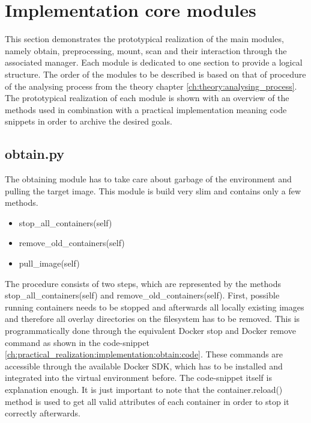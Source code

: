 \section{Implementation core modules}
\label{ch:practical_realization:implementation}
This section demonstrates the prototypical realization of the main modules, namely obtain, preprocessing, mount, scan and their interaction through the associated manager. Each module is dedicated to one section to provide a logical structure. The order of the modules to be described is based on that of procedure of the analysing process from the theory chapter \ref{ch:theory:analysing_process}.
The prototypical realization of each module is shown with an overview of the methods used in combination with a practical implementation meaning code snippets in order to archive the desired goals. 

\subsection{obtain.py}
\label{ch:practical_realization:implementation:obtain}
The obtaining module has to take care about garbage of the environment and pulling the target image.
This module is build very slim and contains only a few methods.
\begin{itemize}
\item stop\_all\_containers(self)
\item remove\_old\_containers(self)
\item pull\_image(self)
\end{itemize}
The procedure consists of two steps, which are represented by the methods stop\_all\_containers(self) and remove\_old\_containers(self). First, possible running containers needs to be stopped and afterwards all locally existing images and therefore all overlay directories on the filesystem has to be removed. This is programmatically done through the equivalent Docker stop and Docker remove command as shown in the code-snippet \ref{ch:practical_realization:implementation:obtain:code}. These commands are accessible through the available Docker SDK, which has to be installed and integrated into the virtual environment before. 
The code-snippet itself is explanation enough. It is just important to note that the container.reload() method is used to get all valid attributes of each container in order to stop it correctly afterwards.

